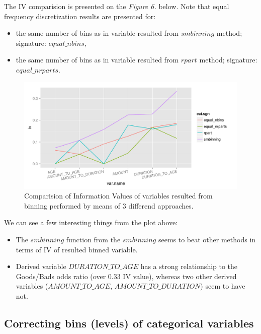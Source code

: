 \documentclass[10pt]{article}\usepackage[]{graphicx}\usepackage[]{color}
\newenvironment{knitrout}{}{} %
\begin{document}
The IV comparision is presented on the \textit{Figure 6.} below. Note that equal frequency discretization results are presented for:
\begin{itemize}
\item the same number of bins as in variable resulted from $smbinning$ method; signature: $equal\_nbins$,
\item the same number of bins as in variable resulted from $rpart$ method; signature: $equal\_nrparts$.
\end{itemize}



\begin{figure}[h!]
\centering
\begin{knitrout}
\color{fgcolor}
\includegraphics[width=.95\linewidth]{figure/unnamed-chunk-9-1} 

\end{knitrout}
\caption{Comparision of Information Values of variables resulted from binning performed by means of 3 differend approaches. }
\end{figure}

We can see a few interesting things from the plot above: 
\begin{itemize}
\item The $smbinning$ function from the $smbinning$ seems to beat other methods in terms of IV of resulted binned variable. 
\item Derived variable $DURATION\_TO\_AGE$ has a strong relationship to the Goods/Bads odds ratio (over 0.33 IV value), whereas two other derived variables ($AMOUNT\_TO\_AGE$, $AMOUNT\_TO\_DURATION$) seem to have not. 
\end{itemize}


\subsection{Correcting bins (levels) of categorical variables}
\end{document}
